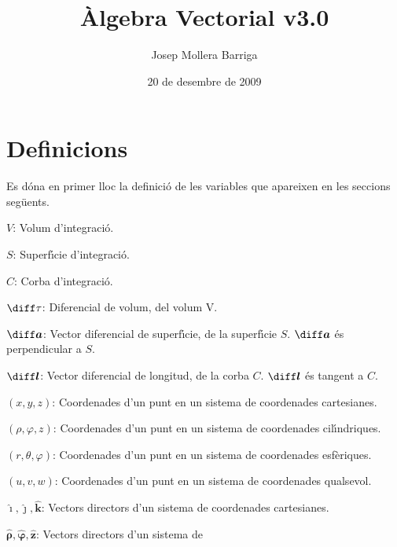 \documentclass[catalan,a4paper,twoside,11pt]{article}
\begin{document}
\title{\`{A}lgebra Vectorial v3.0}
\author{Josep Mollera Barriga}
\date{20 de desembre de 2009}
\maketitle

\begin{multicols}{2}
\scriptsize \tableofcontents
\end{multicols}

\section{Definicions}

Es d\'{o}na  en primer lloc la definici\'{o} de les variables que
apareixen en les seccions seg\"{u}ents.

\begin{list}{}
{\setlength{\labelwidth}{16mm}
\setlength{\leftmargin}{18mm}\setlength{\labelsep}{2mm}}
   \item[$V$:] Volum d'integraci\'{o}.
   \item[$S$:] Superf\'{\i}cie d'integraci\'{o}.
   \item[$C$:] Corba d'integraci\'{o}.
   \item[$\diff\tau$:] Diferencial de volum, del volum V.
   \item[$\boldsymbol{\diff a}$:] Vector diferencial de superf\'{\i}cie, de la superf\'{\i}cie
   $S$. $\boldsymbol{\diff a}$ \'{e}s perpendicular a $S$.
   \item[$\boldsymbol{\diff l}$:] Vector diferencial de longitud, de la corba
   $C$. $\boldsymbol{\diff l}$ \'{e}s tangent a $C$.
   \item[$(x,y,z)$:] Coordenades d'un punt en un sistema de
   coordenades cartesianes.
   \item[$(\rho,\varphi,z)$:] Coordenades d'un punt en un sistema de
   coordenades cil\'{\i}ndriques.
   \item[$(r,\theta,\varphi)$:] Coordenades d'un punt en un sistema de
   coordenades esf\`{e}riques.
   \item[$(u,v,w)$:] Coordenades d'un punt en un sistema de
   coordenades qualsevol.
   \item[$\boldsymbol{\hat{\imath}},\boldsymbol{\hat{\jmath}},\boldsymbol{\hat{k}}$:]
   Vectors directors d'un sistema de  coordenades
   cartesianes.
   \item[$\boldsymbol{\hat{\rho}},\boldsymbol{\hat{\varphi}},\boldsymbol{\hat{z}}$:] Vectors directors d'un sistema de

\end{list}
\end{document}
